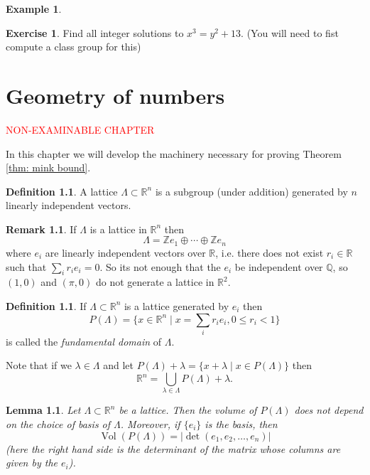 \documentclass[11pt,a4paper]{report}
\theoremstyle{plain}
\newtheorem{lem}[subsection]{Lemma}
\theoremstyle{definition}
\newtheorem{defn}[subsection]{Definition}
\newtheorem{exmp}[subsection]{Example}
\theoremstyle{definition}
\newtheorem{rmrk}[subsection]{Remark}
\newtheorem{question}[subsection]{Exercise}
\newcommand{\ZZ}{\mathbb{Z}}
\newcommand{\RR}{\mathbb{R}}
\def\QQ{\mathbb{Q}}
\def \lam {\lambda}
\DeclareMathOperator{\Vol}{Vol}
\begin{document}
\begin{exmp}
		
		
		
		
	\end{exmp}
	
	
	
	\begin{question}
		Find all integer solutions to $x^3=y^2+13$. (You will need to fist compute a class group for this)
	\end{question}
	
	
	
	
	
	\chapter{Geometry of numbers}
	
	\textcolor{red}{NON-EXAMINABLE CHAPTER}
	
	In this chapter we will develop the machinery necessary for proving Theorem \ref{thm: mink bound}.
	
	\begin{defn}
		A lattice $\Lambda \subset \RR^n$ is a subgroup (under addition) generated by $n$ linearly independent vectors.
	\end{defn}
	
	\begin{rmrk}
		If $\Lambda$ is a lattice in $\RR^n$ then \[\Lambda= \ZZ e_1 \oplus \cdots \oplus \ZZ e_n\] where $e_i$ are linearly independent vectors over $\RR$, i.e. there does not exist $r_i \in \RR$ such that $\sum_i r_ie_i =0$.
		So its not enough that the $e_i$ be independent over $\QQ$, so $(1,0)$ and $(\pi,0)$ do not generate a lattice in $\RR^2$.
	\end{rmrk}
	
	\begin{defn}
		If $\Lambda \subset \RR^n$ is a lattice generated by $e_i$ then \[P(\Lambda)=\{x \in \RR^n \mid x=\sum_i r_ie_i, 0 \leq r_i < 1 \}\] is called the \textit{fundamental domain} of $\Lambda$.
	\end{defn}
	
	Note that if we $\lam \in \Lambda$  and let $P(\Lambda)+\lambda=\{x+ \lam \mid x \in P(\Lambda)\}$ then \[\RR^n= \bigcup_{\lam \in \Lambda} P(\Lambda) +\lam. \]
	
	\begin{lem}
		Let $\Lambda \subset \RR^n$ be a lattice. Then the volume of $P(\Lambda)$ does not depend on the choice of basis of $\Lambda$. Moreover, if $\{e_i\}$ is the basis, then \[\Vol(P(\Lambda))=|\det(e_1,e_2,\dots,e_n)| \] (here the right hand side is the determinant of the matrix whose columns are given by the $e_i$).
	\end{lem}
	
\end{document}
